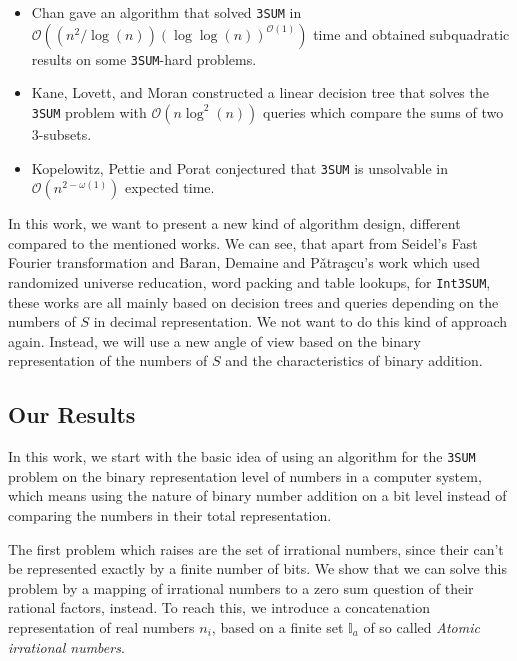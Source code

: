 \begin{itemize}
    \item Chan \cite{chan2019more} gave an algorithm that solved \texttt{3SUM} in $\mathcal{O}\left(\left(n^{2}/\log\left(n\right)\right)\left(\log \log\left(n\right)\right)^{\mathcal{O}\left(1\right)}\right)$ time and obtained subquadratic results on some \texttt{3SUM}-hard problems.
    \item Kane, Lovett, and Moran \cite{kane2017nearoptimal} constructed a linear decision tree that solves the \texttt{3SUM} problem with $\mathcal{O}\left(n \log^{2}\left(n\right)\right)$ queries which compare the sums of two $3$-subsets.
    \item Kopelowitz, Pettie and Porat \cite{kopelowitz2014higher} conjectured that \texttt{3SUM} is unsolvable in $\mathcal{O}\left(n^{2 - \omega\left(1\right)}\right)$ expected time.
\label{it:realtedwork}
\end{itemize}

In this work, we want to present a new kind of algorithm design, different compared to the mentioned works. We can see, that apart from Seidel's  \cite{edelsbrunner1986constructing} Fast Fourier transformation and Baran, Demaine and Pǎtra{\c{s}}cu's \cite{baran2005subquadratic} work which used randomized universe reducation, word packing and table lookups, for \texttt{Int3SUM}, these works are all mainly based on decision trees and queries depending on the numbers of $S$ in decimal representation. We not want to do this kind of approach again. Instead, we will use a new angle of view based on the binary representation of the numbers of $S$ and the characteristics of binary addition.
\subsection{Our Results}
\label{ss:ourresults}
In this work, we start with the basic idea of using an algorithm for the \texttt{3SUM} problem on the binary representation level of numbers in a computer system, which means using the nature of binary number addition on a bit level instead of comparing the numbers in their total representation.

The first problem which raises are the set of irrational numbers, since their can't be represented exactly by a finite number of bits. We show that we can solve this problem by a mapping of irrational numbers to a zero sum question of their rational factors, instead. To reach this, we introduce a concatenation representation of real numbers $n_{i}$, based on a finite set $\mathbb{I}_{a}$ of so called \textit{Atomic irrational numbers}.

